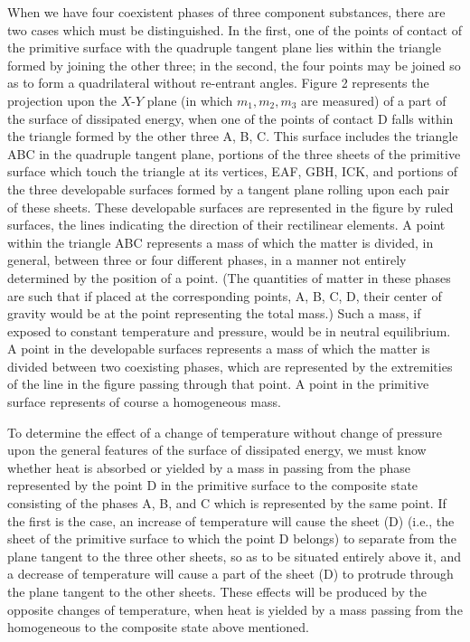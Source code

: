 \documentclass[11pt]{article}
\begin{document}
When we have four coexistent phases of three component substances, there are two cases which must be distinguished. In the first, one of the points of contact of the primitive surface with the quadruple tangent plane lies within the triangle formed by joining the other three; in the second, the four points may be joined so as to form a quadrilateral without re-entrant angles. Figure 2 represents the projection upon the $X$-$Y$ plane (in which $m_1,m_2,m_3$ are measured) of a part of the surface of dissipated energy, when one of the points of contact D falls within the triangle formed by the other three A, B, C. This surface includes the triangle ABC in the quadruple tangent plane, portions of the three sheets of the primitive surface which touch the triangle at its vertices, EAF, GBH, ICK, and portions of the three developable surfaces formed by a tangent plane rolling upon each pair of these sheets. These developable surfaces are represented in the figure by ruled surfaces, the lines indicating the direction of their rectilinear elements. A point within the triangle ABC represents a mass of which the matter is divided, in general, between three or four different phases, in a manner not entirely determined by the position of a point. (The quantities of matter in these phases are such that if placed at the corresponding points, A, B, C, D, their center of gravity would be at the point representing the total mass.) Such a mass, if exposed to constant temperature and pressure, would be in neutral equilibrium. A point in the developable surfaces represents a mass of which the matter is divided between two coexisting phases, which are represented by the extremities of the line in the figure passing through that point. A point in the primitive surface represents of course a homogeneous mass.

To determine the effect of a change of temperature without change of pressure upon the general features of the surface of dissipated energy, we must know whether heat is absorbed or yielded by a mass in passing from the phase represented by the point D in the primitive surface to the composite state consisting of the phases A, B, and C which is represented by the same point. If the first is the case, an increase of temperature will cause the sheet (D) (i.e., the sheet of the primitive surface to which the point D belongs) to separate from the plane tangent to the three other sheets, so as to be situated entirely above it, and a decrease of temperature will cause a part of the sheet (D) to protrude through the plane tangent to the other sheets. These effects will be produced by the opposite changes of temperature, when heat is yielded by a mass passing from the homogeneous to the composite state above mentioned.
\end{document}
